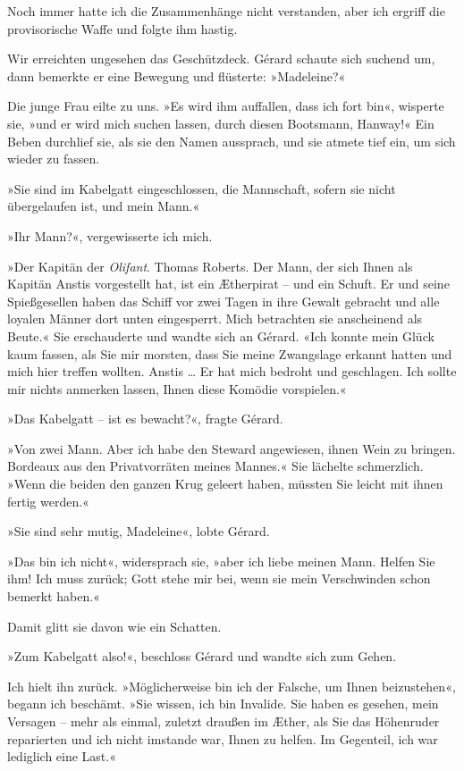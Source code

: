 Noch immer hatte ich die Zusammenhänge nicht verstanden, aber ich
ergriff die provisorische Waffe und folgte ihm hastig.

\bigpar

Wir erreichten ungesehen das Geschützdeck. Gérard schaute sich
suchend um, dann bemerkte er eine Bewegung und flüsterte:
»Madeleine?«

Die junge Frau eilte zu uns. »Es wird ihm auffallen, dass ich fort
bin«, wisperte sie, »und er wird mich suchen lassen, durch diesen
Bootsmann, Hanway!« Ein Beben durchlief sie, als sie den Namen
aussprach, und sie atmete tief ein, um sich wieder zu fassen.

»Sie sind im Kabelgatt eingeschlossen, die Mannschaft, sofern sie
nicht übergelaufen ist, und mein Mann.«

»Ihr Mann?«, vergewisserte ich mich.

»Der Kapitän der \emph{Olifant}. Thomas Roberts. Der Mann, der sich
Ihnen als Kapitän Anstis vorgestellt hat, ist ein Ætherpirat – und
ein Schuft. Er und seine Spießgesellen haben das Schiff vor zwei
Tagen in ihre Gewalt gebracht und alle loyalen Männer dort unten
eingesperrt. Mich betrachten sie anscheinend als Beute.« Sie
erschauderte und wandte sich an Gérard. «Ich konnte mein Glück kaum
fassen, als Sie mir morsten, dass Sie meine Zwangslage erkannt
hatten und mich hier treffen wollten. Anstis \ldots{} Er hat mich
bedroht und geschlagen. Ich sollte mir nichts anmerken lassen,
Ihnen diese Komödie vorspielen.«

»Das Kabelgatt – ist es bewacht?«, fragte Gérard.

»Von zwei Mann. Aber ich habe den Steward angewiesen, ihnen Wein zu
bringen. Bordeaux aus den Privatvorräten meines Mannes.« Sie
lächelte schmerzlich. »Wenn die beiden den ganzen Krug geleert
haben, müssten Sie leicht mit ihnen fertig werden.«

»Sie sind sehr mutig, Madeleine«, lobte Gérard.

»Das bin ich nicht«, widersprach sie, »aber ich liebe meinen Mann.
Helfen Sie ihm! Ich muss zurück; Gott stehe mir bei, wenn sie mein
Verschwinden schon bemerkt haben.«

Damit glitt sie davon wie ein Schatten.

\bigpar

»Zum Kabelgatt also!«, beschloss Gérard und wandte sich zum Gehen.

Ich hielt ihn zurück. »Möglicherweise bin ich der Falsche, um Ihnen
beizustehen«, begann ich beschämt. »Sie wissen, ich bin Invalide.
Sie haben es gesehen, mein Versagen – mehr als einmal, zuletzt
draußen im Æther, als Sie das Höhenruder reparierten und ich nicht
imstande war, Ihnen zu helfen. Im Gegenteil, ich war lediglich eine
Last.«

